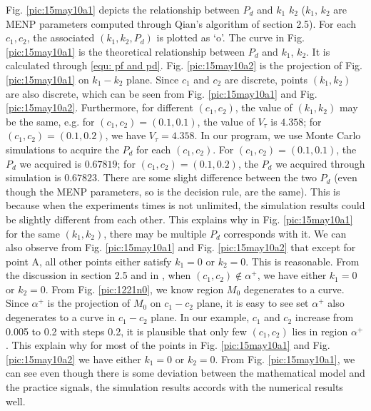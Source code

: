 Fig. \ref{pic:15may10a1} depicts the relationship between  $P_d$ and $k_1$ $k_2$ ($k_1$, $k_2$ are MENP parameters computed through Qian's algorithm of section 2.5).
For each $c_1, c_2$, the associated $(k_1, k_2, P_d)$ is plotted as `o'. The curve in Fig. \ref{pic:15may10a1} is the theoretical relationship between $P_d$ and $k_1$, $k_2$. It is calculated through \eqref{equ: pf and pd}. Fig. \ref{pic:15may10a2} is the projection of Fig. \ref{pic:15may10a1} on $k_1-k_2$ plane.
Since $c_1$ and $c_2$ are discrete, points $(k_1, k_2)$ are also discrete, which can be seen from Fig. \ref{pic:15may10a1} and Fig. \ref{pic:15may10a2}. 
Furthermore, for different $(c_1, c_2)$, the value of $(k_1, k_2)$ may be the same, 
e.g. for $(c_1, c_2) = (0.1, 0.1)$, the value of $V_\tau$ is $4.358$; for $(c_1, c_2) = (0.1, 0.2)$, we have $V_\tau = 4.358$.  
In our program, we use Monte Carlo simulations to acquire the $P_d$ for each $(c_1, c_2)$.  For  $(c_1, c_2) = (0.1, 0.1)$, the $P_d$ we acquired is $0.67819$; for $(c_1, c_2) = (0.1, 0.2)$, the $P_d$ we acquired through simulation is $0.67823$. There are some slight difference between the two $P_d$ (even though the MENP parameters, so is the decision rule, are the same). This is because when the experiments times is not unlimited, the simulation results could be slightly different from each other. This explains why in Fig. \ref{pic:15may10a1} for the same $(k_1, k_2)$, there may be multiple $P_d$ corresponds with it.  
We can also observe from Fig. \ref{pic:15may10a1} and Fig. \ref{pic:15may10a2} that except for point A, all other points either satisfy $k_1 = 0$ or $k_2 = 0$. This is reasonable. From the discussion in section 2.5 and in \cite{zhang2000efficient}, when $(c_1, c_2) \notin \alpha^+$, we have either $k_1 = 0$ or $k_2 = 0$. From Fig. \ref{pic:1221n0}, we know region $M_0$ degenerates to a curve. Since $\alpha^+$ is the projection of $M_0$ on $c_1-c_2$ plane, it is easy to see set $\alpha^+$ also degenerates to a curve in $c_1-c_2$ plane. In our example, $c_1$ and $c_2$ increase from 0.005 to 0.2 with steps 0.2, it is plausible that only few $(c_1, c_2)$ lies in region $\alpha^+$. This explain why for most of the points in Fig. \ref{pic:15may10a1} and Fig. \ref{pic:15may10a2} we have either $k_1 = 0$ or $k_2 = 0$.
From Fig. \ref{pic:15may10a1}, we can see even though there is some deviation between the mathematical model and the practice signals, the simulation results accords with the numerical results well. 

